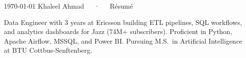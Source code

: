 \documentclass[11pt, a4paper]{awesome-cv}
\begin{document}
\makecvheader[C]

\makecvfooter
  {\today}
  {Khaleel Ahmad~~~·~~~Résumé}
  {\thepage}



\begin{cvparagraph}
Data Engineer with 3 years at Ericsson building ETL pipelines, SQL workflows, and analytics dashboards for Jazz (74M+ subscribers). Proficient in Python, Apache Airflow, MSSQL, and Power BI. Pursuing M.S.\ in Artificial Intelligence at BTU Cottbus-Senftenberg.
\end{cvparagraph}


\end{document}
